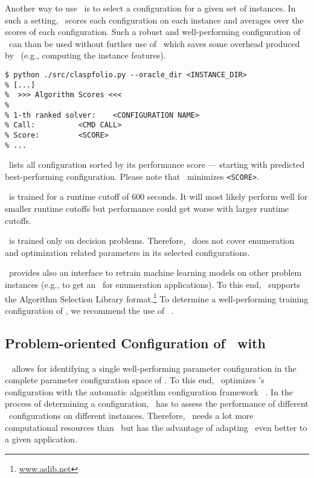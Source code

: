 Another way to use \claspfolio\ is to select a configuration for a given set of instances.
In such a setting, \claspfolio\ scores each configuration on each instance 
and averages over the scores of each configuration.
Such a robust and well-performing configuration of \clasp\ can than be used without further use of \claspfolio\
which saves some overhead produced by \claspfolio\ (e.g., computing the instance features).

\begin{lstlisting}[numbers=none]
$ python ./src/claspfolio.py --oracle_dir <INSTANCE_DIR>
% [...]
%  >>> Algorithm Scores <<<
% 
% 1-th ranked solver: 	 <CONFIGURATION NAME>
% Call: 		 <CMD CALL>
% Score: 		 <SCORE>
% ...
\end{lstlisting}
%
\claspfolio\ lists all configuration sorted by its performance score --- starting with predicted best-performing configuration.
Please note that \claspfolio\ minimizes \texttt{<SCORE>}.

\begin{note}
\claspfolio\ is trained for a runtime cutoff of $600$ seconds. 
It will most likely perform well for smaller runtime cutoffs 
but performance could get worse with larger runtime cutoffs.
\end{note}

\begin{note}
\claspfolio\ is trained only on decision problems.
Therefore, \claspfolio\ does not cover enumeration and optimization related parameters in its selected configurations.
\end{note}

\claspfolio\ provides also an interface to retrain machine learning models on other problem instances 
(e.g., to get an \claspfolio\ for enumeration applications).
To this end, \claspfolio\ supports the Algorithm Selection Library format.\footnote{\url{www.aslib.net}}
To determine a well-performing training configuration of \claspfolio,
we recommend the use of \sysfont{autofolio}~\cite{lihohusc15a}.%

\subsection{Problem-oriented Configuration of \clasp\ with \piclasp}
\label{sec:piclasp}

\piclasp\ %
allows for identifying a single well-performing parameter configuration 
in the complete parameter configuration space of \clasp.
To this end, \piclasp\ optimizes \clasp's configuration with the automatic algorithm configuration framework \smac~\cite{huhole11b}.
In the process of determining a configuration,
\piclasp\ has to assess the performance of different \clasp\ configurations on different instances. 
Therefore, \piclasp\ needs a lot more computational resources than \claspfolio\
but has the advantage of adapting \clasp\ even better to a given application.
 
